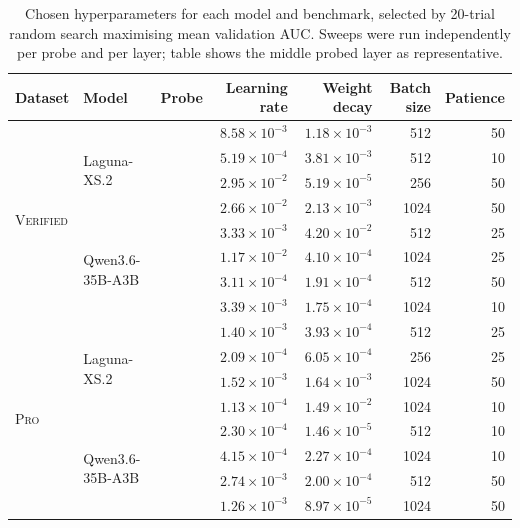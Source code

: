\begin{table}[t]
\centering
\caption{Chosen hyperparameters for each model and benchmark, selected by 20-trial random search maximising mean validation AUC. Sweeps were run independently per probe and per layer; table shows the middle probed layer as representative.}
\label{tab:probe-hparams}
\begin{tabular}{lllrrrr}
\toprule
Dataset & Model & Probe & Learning rate & Weight decay & Batch size & Patience \\
\midrule
\multirow{8}{*}{\textsc{Verified}} & \multirow{4}{*}{Laguna-XS.2} & \Syntactic{} & $8.58 \times 10^{-3}$ & $1.18 \times 10^{-3}$ & 512 & 50 \\
 &  & \Semantic{} & $5.19 \times 10^{-4}$ & $3.81 \times 10^{-3}$ & 512 & 10 \\
 &  & \Regressions{} & $2.95 \times 10^{-2}$ & $5.19 \times 10^{-5}$ & 256 & 50 \\
 &  & \RedFail{} & $2.66 \times 10^{-2}$ & $2.13 \times 10^{-3}$ & 1024 & 50 \\
 & \multirow{4}{*}{Qwen3.6-35B-A3B} & \Syntactic{} & $3.33 \times 10^{-3}$ & $4.20 \times 10^{-2}$ & 512 & 25 \\
 &  & \Semantic{} & $1.17 \times 10^{-2}$ & $4.10 \times 10^{-4}$ & 1024 & 25 \\
 &  & \Regressions{} & $3.11 \times 10^{-4}$ & $1.91 \times 10^{-4}$ & 512 & 50 \\
 &  & \RedFail{} & $3.39 \times 10^{-3}$ & $1.75 \times 10^{-4}$ & 1024 & 10 \\
\midrule
\multirow{8}{*}{\textsc{Pro}} & \multirow{4}{*}{Laguna-XS.2} & \Syntactic{} & $1.40 \times 10^{-3}$ & $3.93 \times 10^{-4}$ & 512 & 25 \\
 &  & \Semantic{} & $2.09 \times 10^{-4}$ & $6.05 \times 10^{-4}$ & 256 & 25 \\
 &  & \RedFail{} & $1.52 \times 10^{-3}$ & $1.64 \times 10^{-3}$ & 1024 & 50 \\
 &  & \Regressions{} & $1.13 \times 10^{-4}$ & $1.49 \times 10^{-2}$ & 1024 & 10 \\
 & \multirow{4}{*}{Qwen3.6-35B-A3B} & \Syntactic{} & $2.30 \times 10^{-4}$ & $1.46 \times 10^{-5}$ & 512 & 10 \\
 &  & \Semantic{} & $4.15 \times 10^{-4}$ & $2.27 \times 10^{-4}$ & 1024 & 10 \\
 &  & \Regressions{} & $2.74 \times 10^{-3}$ & $2.00 \times 10^{-4}$ & 512 & 50 \\
 &  & \RedFail{} & $1.26 \times 10^{-3}$ & $8.97 \times 10^{-5}$ & 1024 & 50 \\
\bottomrule
\end{tabular}
\end{table}
